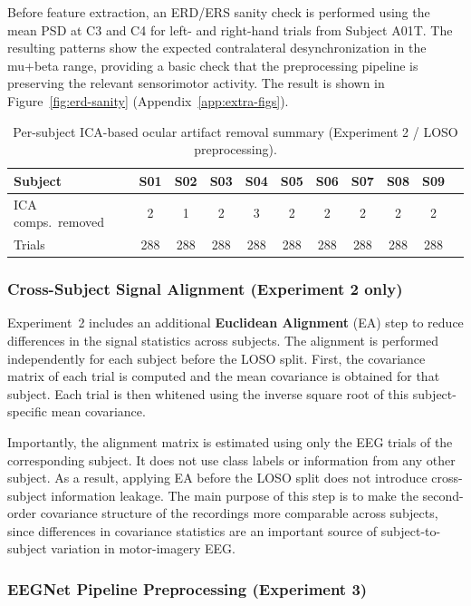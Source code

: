 \documentclass[11pt,a4paper]{article}
\begin{document}
	Before feature extraction, an ERD/ERS sanity check is performed using the mean PSD at C3 and C4
	for left- and right-hand trials from Subject A01T. The resulting patterns show the expected
	contralateral desynchronization in the mu+beta range, providing a basic check that the preprocessing
	pipeline is preserving the relevant sensorimotor activity. The result is shown in
	Figure~\ref{fig:erd-sanity} (Appendix~\ref{app:extra-figs}).
	
	\begin{table}[H]
		\centering
		\caption{Per-subject ICA-based ocular artifact removal summary (Experiment 2 / LOSO preprocessing).}
		\label{tab:ica-removed}
		\begin{tabular}{lcccccccccc}
			\toprule
			Subject & S01 & S02 & S03 & S04 & S05 & S06 & S07 & S08 & S09 \\
			\midrule
			ICA comps.\ removed & 2 & 1 & 2 & 3 & 2 & 2 & 2 & 2 & 2 \\
			Trials & 288 & 288 & 288 & 288 & 288 & 288 & 288 & 288 & 288 \\
			\bottomrule
		\end{tabular}
	\end{table}
	
	\subsubsection{Cross-Subject Signal Alignment (Experiment 2 only)}
	
	Experiment~2 includes an additional \textbf{Euclidean Alignment} (EA) step
	\cite{he2020ea} to reduce differences in the signal statistics across subjects. The alignment
	is performed independently for each subject before the LOSO split. First, the covariance matrix
	of each trial is computed and the mean covariance is obtained for that subject. Each trial is then
	whitened using the inverse square root of this subject-specific mean covariance.
	
	Importantly, the alignment matrix is estimated using only the EEG trials of the corresponding
	subject. It does not use class labels or information from any other subject. As a result, applying
	EA before the LOSO split does not introduce cross-subject information leakage. The main purpose of
	this step is to make the second-order covariance structure of the recordings more comparable across
	subjects, since differences in covariance statistics are an important source of subject-to-subject
	variation in motor-imagery EEG.
	\subsubsection{EEGNet Pipeline Preprocessing (Experiment 3)}
	
\end{document}
